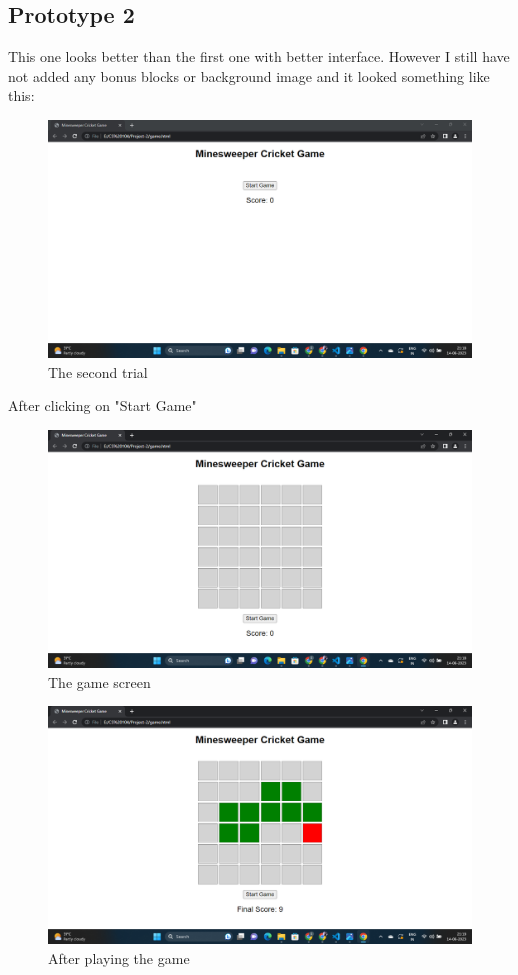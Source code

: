 \documentclass{article}
\begin{document}
\subsection{Prototype 2}
This one looks better than the first one with better interface. However I still have not added any bonus blocks or background image and it looked something like this:
\begin{figure}
[H]
   \includegraphics[width=\linewidth]{Screenshot (221).png}
   \caption{The second trial}
\end{figure}
After clicking on "Start Game"
\begin{figure}
[H]
   \includegraphics[width=\linewidth]{Screenshot (222).png}
   \caption{The game screen}
\end{figure}
\begin{figure}
[H]
   \includegraphics[width=\linewidth]{Screenshot (223).png}
   \caption{After playing the game}
\end{figure}
\maketitle
\end{document}
